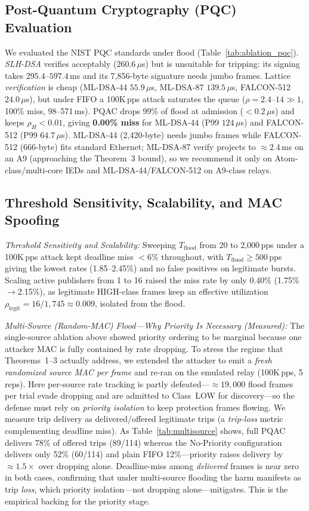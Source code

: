 \documentclass[journal]{IEEEtran}
\begin{document}
\subsection{Post-Quantum Cryptography (PQC) Evaluation}
We evaluated the NIST PQC standards under flood (Table~\ref{tab:ablation_pqc}). \emph{SLH-DSA} verifies acceptably ($260.6\,\mu$s) but is unsuitable for tripping: its signing takes $295.4$--$597.4$\,ms and its 7{,}856-byte signature needs jumbo frames. Lattice \emph{verification} is cheap (ML-DSA-44 $55.9\,\mu$s, ML-DSA-87 $139.5\,\mu$s, FALCON-512 $24.0\,\mu$s), but under FIFO a 100K\,pps attack saturates the queue ($\rho=2.4$--$14\gg 1$, 100\% miss, 98--571\,ms). PQAC drops 99\% of flood at admission ($<0.2\,\mu$s) and keeps $\rho_H<0.01$, giving \textbf{0.00\% miss} for ML-DSA-44 (P99 $124\,\mu$s) and FALCON-512 (P99 $64.7\,\mu$s). ML-DSA-44 (2{,}420-byte) needs jumbo frames while FALCON-512 (666-byte) fits standard Ethernet; ML-DSA-87 verify projects to $\approx 2.4$\,ms on an A9 (approaching the Theorem~3 bound), so we recommend it only on Atom-class/multi-core IEDs and ML-DSA-44/FALCON-512 on A9-class relays.

\subsection{Threshold Sensitivity, Scalability, and MAC Spoofing}
\label{sec:spoof_eval}
\textit{Threshold Sensitivity and Scalability:} Sweeping $T_{\text{flood}}$ from 20 to 2{,}000\,pps under a 100K\,pps attack kept deadline miss $<6\%$ throughout, with $T_{\text{flood}}\ge 500$\,pps giving the lowest rates (1.85--2.45\%) and no false positives on legitimate bursts. Scaling active publishers from 1 to 16 raised the miss rate by only 0.40\% (1.75\%$\to$2.15\%), as legitimate HIGH-class frames keep an effective utilization $\rho_{\text{legit}}=16/1{,}745\approx 0.009$, isolated from the flood.

\textit{Multi-Source (Random-MAC) Flood---Why Priority Is Necessary (Measured):} The single-source ablation above showed priority ordering to be marginal because one attacker MAC is fully contained by rate dropping. To stress the regime that Theorems~1--3 actually address, we extended the attacker to emit a \emph{fresh randomized source MAC per frame} and re-ran on the emulated relay (100K\,pps, 5 reps). Here per-source rate tracking is partly defeated---$\approx 19{,}000$ flood frames per trial evade dropping and are admitted to Class~LOW for discovery---so the defense must rely on \emph{priority isolation} to keep protection frames flowing. We measure trip delivery as delivered/offered legitimate trips (a \emph{trip-loss} metric complementing deadline miss). As Table~\ref{tab:multisource} shows, full PQAC delivers 78\% of offered trips (89/114) whereas the No-Priority configuration delivers only 52\% (60/114) and plain FIFO 12\%---priority raises delivery by $\approx 1.5\times$ over dropping alone. Deadline-miss among \emph{delivered} frames is near zero in both cases, confirming that under multi-source flooding the harm manifests as trip \emph{loss}, which priority isolation---not dropping alone---mitigates. This is the empirical backing for the priority stage.
\end{document}
